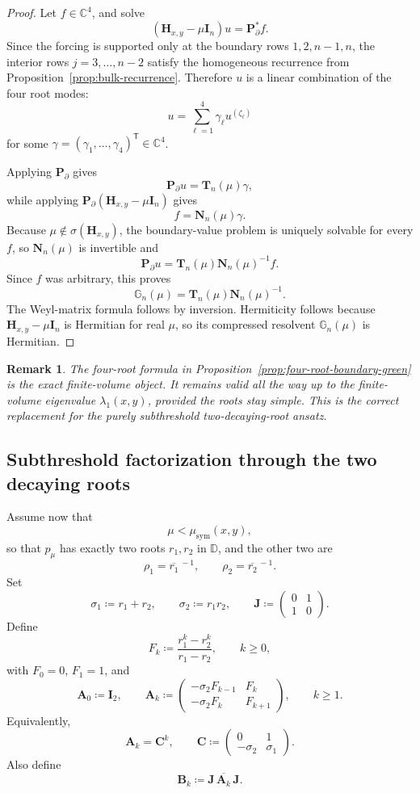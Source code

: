 \documentclass[11pt]{article}
\newtheorem{remark}[theorem]{Remark}
\begin{document}
\begin{proof}
Let \(f\in\mathbb C^4\), and solve
\[
(\mathbf H_{x,y}-\mu\mathbf I_n)u=\mathbf P_\partial^* f.
\]
Since the forcing is supported only at the boundary rows \(1,2,n-1,n\), the interior rows
\(j=3,\dots,n-2\) satisfy the homogeneous recurrence from
Proposition~\ref{prop:bulk-recurrence}. Therefore \(u\) is a linear combination of the four
root modes:
\[
u=\sum_{\ell=1}^4 \gamma_\ell u^{(\zeta_\ell)}
\]
for some \(\gamma=(\gamma_1,\dots,\gamma_4)^{\mathsf T}\in\mathbb C^4\).

Applying \(\mathbf P_\partial\) gives
\[
\mathbf P_\partial u=\mathbf T_n(\mu)\gamma,
\]
while applying \(\mathbf P_\partial(\mathbf H_{x,y}-\mu\mathbf I_n)\) gives
\[
f=\mathbf N_n(\mu)\gamma.
\]
Because \(\mu\notin\sigma(\mathbf H_{x,y})\), the boundary-value problem is uniquely solvable for every
\(f\), so \(\mathbf N_n(\mu)\) is invertible and
\[
\mathbf P_\partial u=\mathbf T_n(\mu)\mathbf N_n(\mu)^{-1}f.
\]
Since \(f\) was arbitrary, this proves
\[
\mathbb G_n(\mu)=\mathbf T_n(\mu)\mathbf N_n(\mu)^{-1}.
\]
The Weyl-matrix formula follows by inversion. Hermiticity follows because
\(\mathbf H_{x,y}-\mu\mathbf I_n\) is Hermitian for real \(\mu\), so its compressed resolvent
\(\mathbb G_n(\mu)\) is Hermitian.
\end{proof}

\begin{remark}
The four-root formula in Proposition~\ref{prop:four-root-boundary-green} is the exact finite-volume object.
It remains valid all the way up to the finite-volume eigenvalue \(\lambda_1(x,y)\), provided the roots stay simple.
This is the correct replacement for the purely subthreshold two-decaying-root ansatz.
\end{remark}

\subsection*{Subthreshold factorization through the two decaying roots}

Assume now that
\[
\mu<\mu_{\mathrm{sym}}(x,y),
\]
so that \(p_\mu\) has exactly two roots \(r_1,r_2\) in \(\mathbb D\), and the other two are
\[
\rho_1=\overline{r_1}^{\,-1},
\qquad
\rho_2=\overline{r_2}^{\,-1}.
\]
Set
\[
\sigma_1\coloneqq r_1+r_2,
\qquad
\sigma_2\coloneqq r_1r_2,
\qquad
\mathbf J\coloneqq
\begin{pmatrix}
0&1\\
1&0
\end{pmatrix}.
\]
Define
\[
F_k\coloneqq \frac{r_1^k-r_2^k}{r_1-r_2},
\qquad k\ge 0,
\]
with \(F_0=0\), \(F_1=1\), and
\[
\mathbf A_0\coloneqq \mathbf I_2,
\qquad
\mathbf A_k\coloneqq
\begin{pmatrix}
-\sigma_2 F_{k-1} & F_k\\
-\sigma_2 F_k & F_{k+1}
\end{pmatrix},
\qquad k\ge 1.
\]
Equivalently,
\[
\mathbf A_k=\mathbf C^k,
\qquad
\mathbf C\coloneqq
\begin{pmatrix}
0&1\\
-\sigma_2&\sigma_1
\end{pmatrix}.
\]
Also define
\[
\mathbf B_k\coloneqq \mathbf J\,\overline{\mathbf A_k}\,\mathbf J.
\]
\end{document}
